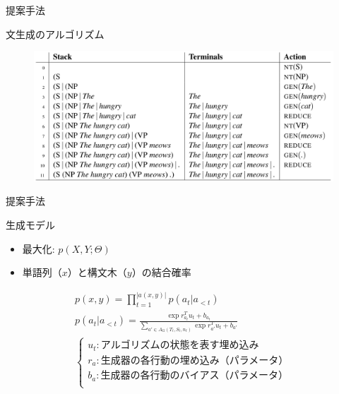 \documentclass[aspectratio=43,unicode,10pt]{beamer}
\begin{document}
\begin{frame}{提案手法}
  \begin{block}{文生成のアルゴリズム}
    \begin{figure}
        \includegraphics[width=\textwidth]{fig/fig_4.png}
    \end{figure}
  \end{block}
\end{frame}

\begin{frame}{提案手法}
  \begin{block}{生成モデル}
    \begin{itemize}
      \item 最大化: $p(X, Y; \Theta)$
      \item 単語列（$x$）と構文木（$y$）の結合確率
    \end{itemize}
    \begin{gather*}
      p(x, y) = \prod_{t=1}^{|a(x, y)|} p(a_t | a_{<t}) \\
      p(a_t | a_{<t})
      = \frac{\exp r_{a_t}^T u_t + b_{a_t}}
        {\sum_{a' \in A_G(T_t, S_t, n_t)} \exp r_{a'}^T u_t + b_{a'}} \\
      \begin{cases}
        u_t: \text{アルゴリズムの状態を表す埋め込み} \\
        r_a: \text{生成器の各行動の埋め込み（パラメータ）} \\
        b_a: \text{生成器の各行動のバイアス（パラメータ）} \\
      \end{cases}
    \end{gather*}
  \end{block}
\end{frame}
\end{document}

